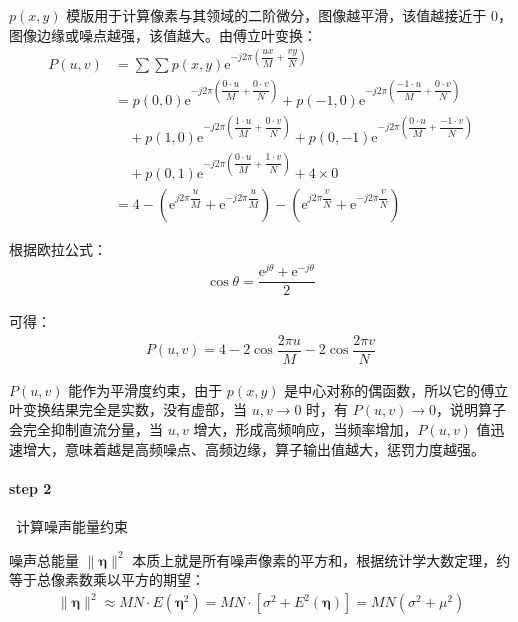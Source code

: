\documentclass{article}
\newcommand{\e}{\mathrm{e}}
\begin{document}
$p(x,y)$ 模版用于计算像素与其领域的二阶微分，图像越平滑，该值越接近于 0，图像边缘或噪点越强，该值越大。由傅立叶变换：
\begin{align*}
    P(u,v)&=\displaystyle\sum\sum p(x,y)\e^{\displaystyle-j2\pi\left(\dfrac{ux}{M}+\dfrac{vy}{N}\right)}
    \\
    &=p(0,0)\e^{\displaystyle-j2\pi\left(\dfrac{0\cdot u}{M}+\dfrac{0\cdot v}{N}\right)}+p(-1,0)\e^{\displaystyle-j2\pi\left(\dfrac{-1\cdot u}{M}+\dfrac{0\cdot v}{N}\right)}
    \\
    &\quad+p(1,0)\e^{\displaystyle-j2\pi\left(\dfrac{1\cdot u}{M}+\dfrac{0\cdot v}{N}\right)}+p(0,-1)\e^{\displaystyle-j2\pi\left(\dfrac{0\cdot u}{M}+\dfrac{-1\cdot v}{N}\right)}
    \\
    &\quad+p(0,1)\e^{\displaystyle-j2\pi\left(\dfrac{0\cdot u}{M}+\dfrac{1\cdot v}{N}\right)}+4\times0
    \\
    &=4-\left(\e^{\displaystyle j2\pi\dfrac{u}{M}}+\e^{\displaystyle-j2\pi\dfrac{u}{M}}\right)-\left(\e^{\displaystyle j2\pi\dfrac{v}{N}}+\e^{\displaystyle-j2\pi\dfrac{v}{N}}\right)
\end{align*}

根据欧拉公式：
\begin{align*}
    \cos\theta=\dfrac{\e^{\displaystyle j\theta}+\e^{\displaystyle-j\theta}}{2}
\end{align*}

可得：
\begin{align*}
    P(u,v)=4-2\cos\dfrac{2\pi u}{M}-2\cos\dfrac{2\pi v}{N}
\end{align*}

$P(u,v)$ 能作为平滑度约束，由于 $p(x,y)$ 是中心对称的偶函数，所以它的傅立叶变换结果完全是实数，没有虚部，当 $u,v\to0$ 时，有 $P(u,v)\to0$，说明算子会完全抑制直流分量，当 $u,v$ 增大，形成高频响应，当频率增加，$P(u,v)$ 值迅速增大，意味着越是高频噪点、高频边缘，算子输出值越大，惩罚力度越强。

\paragraph*{step 2}~{计算噪声能量约束}

噪声总能量 $\lVert\bm{\eta}\rVert^2$ 本质上就是所有噪声像素的平方和，根据统计学大数定理，约等于总像素数乘以平方的期望：
\begin{align*}
    \lVert\bm{\eta}\rVert^2\approx MN\cdot E(\bm{\eta}^2)=MN\cdot\left[\sigma^2+E^2(\bm{\eta})\right]=MN(\sigma^2+\mu^2)
\end{align*}
\end{document}
